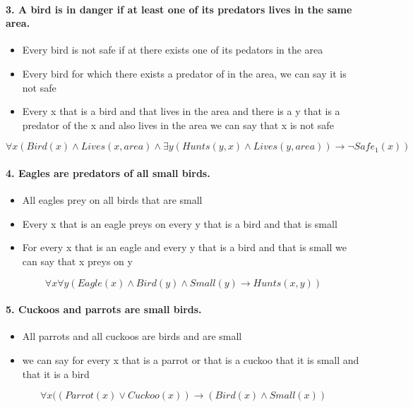 \documentclass[11pt,a4paper]{article}
\newenvironment{solution}{%
    \begin{tcolorbox}[
        breakable,
        colback=green!4,
        colframe=green!50!black,
        fonttitle=\bfseries,
        title={ Solution},
        left=6pt, right=6pt, top=4pt, bottom=4pt
    ]%
    }{%
    \end{tcolorbox}%
}
\begin{document}
\begin{solution}
        \paragraph{3. A bird is in danger if at least one of its predators lives in the same area.}
        \begin{itemize}
            \item Every bird is not safe if at there exists one of its pedators in the area
            \item Every bird for which there exists a predator of in the area, we can say it is not safe
            \item Every x that is a bird and that lives in the area and there is a y that is a predator of the x and also lives in the area we can say that x is not safe
        \end{itemize}
        \[
            \forall x (
            Bird(x) \land
            Lives(x, area) \land
            \exists y (
            Hunts(y,x) \land
            Lives(y,area)
            )
            \rightarrow \neg Safe_1(x)
            )
        \]

        \paragraph{4. Eagles are predators of all small birds.}
        \begin{itemize}
            \item All eagles prey on all birds that are small
            \item Every x that is an eagle preys on every y that is a bird and that is small
            \item For every x that is an eagle and every y that is a bird and that is small we can say that x preys on y
        \end{itemize}
        \[
            \forall x \forall y(
            Eagle(x) \land
            Bird(y) \land
            Small(y)
            \rightarrow
            Hunts(x,y)
            )
        \]


        \paragraph{5. Cuckoos and parrots are small birds.}
        \begin{itemize}
            \item All parrots and all cuckoos are birds and are small
            \item we can say for every x that is a parrot or that is a cuckoo that it is small and that it is a bird
        \end{itemize}
        \[
            \forall x ( (Parrot(x) \lor Cuckoo(x)) \rightarrow (Bird(x) \land Small(x))
        \]



\end{solution}
\end{document}
